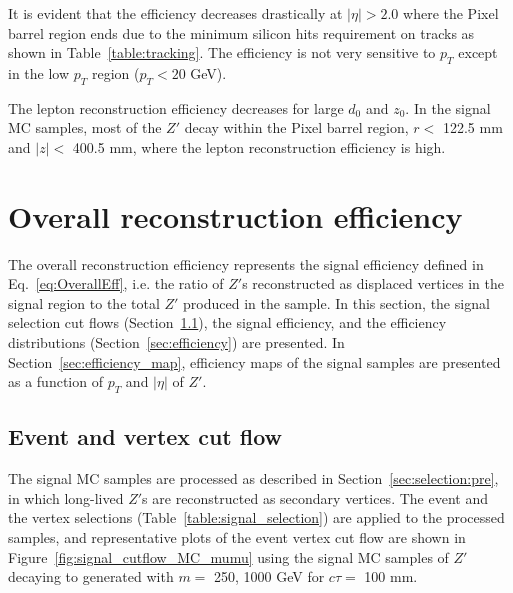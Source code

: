 It is evident that the efficiency decreases drastically at $|\eta| > 2.0$ where the Pixel barrel region ends due to the minimum silicon hits requirement on tracks as shown in Table~\ref{table:tracking}. The efficiency is not very sensitive to $p_{T}$ except in the low $p_{T}$ region ($p_{T} < 20$ GeV).

The lepton reconstruction efficiency decreases for large $d_{0}$ and $z_{0}$. In the signal MC samples, most of the $Z'$ decay within the Pixel barrel region, $r < $ 122.5 mm and $|z| < $ 400.5 mm, where the lepton reconstruction efficiency is high.

\section{Overall reconstruction efficiency}
\label{sec:combined_reco_efficiency}
The overall reconstruction efficiency represents the signal efficiency defined in Eq.~\ref{eq:OverallEff}, i.e. the ratio of $Z'$s reconstructed as displaced vertices in the signal region to the total $Z'$ produced in the sample. In this section, the signal selection cut flows (Section~\ref{sec:signal_cutflow}), the signal efficiency, and the efficiency distributions (Section~\ref{sec:efficiency}) are presented. In Section~\ref{sec:efficiency_map}, efficiency maps of the signal samples are presented as a function of $p_{T}$ and $|\eta|$ of $Z'$.

\subsection{Event and vertex cut flow}
\label{sec:signal_cutflow}
The signal MC samples are processed as described in Section~\ref{sec:selection:pre}, in which long-lived $Z'$s are reconstructed as secondary vertices. The event and the vertex selections (Table~\ref{table:signal_selection}) are applied to the processed samples, and representative plots of the event vertex cut flow are shown in Figure~\ref{fig:signal_cutflow_MC_mumu} using the signal MC samples of $Z'$ decaying to \mumu generated with $m=$ 250, 1000 GeV for $c\tau=$ 100 mm.

